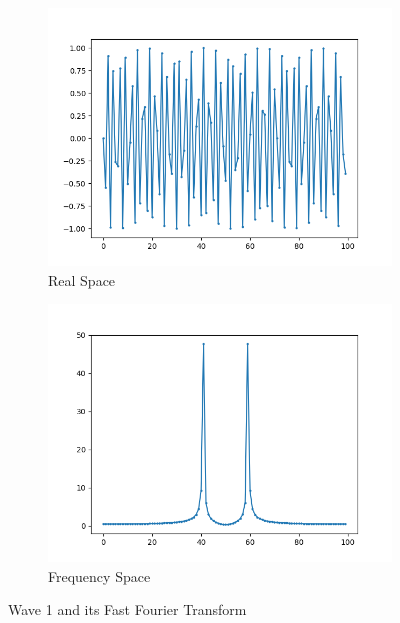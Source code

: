 \documentclass{amsproc}
\begin{document}
\begin{figure}[h]
\centering
\begin{subfigure}{.4\textwidth}
	\centering
	\includegraphics[scale=.3]{images/FFTOriginal1.png}
	\caption{Real Space}
	\label{fig:sub1}
\end{subfigure} %
\begin{subfigure}{.4\textwidth}
	\centering
	\includegraphics[scale=.3]{images/FFTResult1.png}
	\caption{Frequency Space}
	\label{fig:sub2}
\end{subfigure}
\caption{Wave 1 and its Fast Fourier Transform}
\label{fig:text1}
\end{figure}
\end{document}
